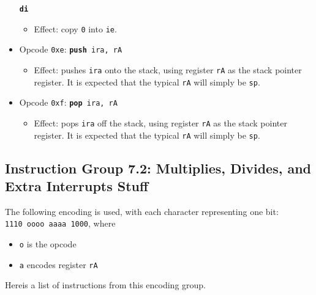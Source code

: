 \documentclass{article}
\begin{document}
\begin{itemize}
			\texttt{\textbf{di}}
		\begin{itemize}
			\item Effect:  copy \texttt{0} into \texttt{ie}.
		\end{itemize}
		\item Opcode \texttt{0xe}:
			\texttt{\textbf{push} ira, rA}
		\begin{itemize}
			\item Effect:  pushes \texttt{ira} onto the stack, using
			register \texttt{rA} as the stack pointer register.  It is
			expected that the typical \texttt{rA} will simply be
			\texttt{sp}.
		\end{itemize}
		\item Opcode \texttt{0xf}:
			\texttt{\textbf{pop} ira, rA}
		\begin{itemize}
			\item Effect:  pops \texttt{ira} off the stack, using
			register \texttt{rA} as the stack pointer register.  It is
			expected that the typical \texttt{rA} will simply be
			\texttt{sp}.
		\end{itemize}
	\end{itemize}
	\doublespacing

	\subsection{Instruction Group 7.2:  Multiplies, Divides, and
	Extra Interrupts Stuff}
	The following encoding is used, with each character representing one
	bit:  \\
	\texttt{1110 oooo aaaa 1000}, where

	\singlespacing
	\begin{itemize}
		\item \texttt{o} is the opcode
		\item \texttt{a} encodes register \texttt{rA}
	\end{itemize}
	\doublespacing

	Hereis a list of instructions from this encoding group.
\end{document}

